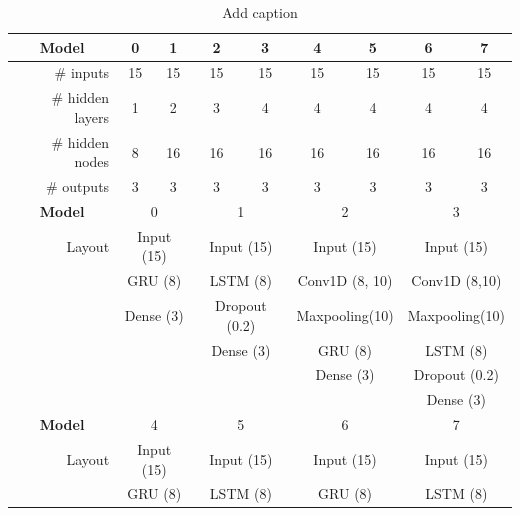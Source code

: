 \begin{table}[htbp]
  \centering
  \caption{Add caption}
    \begin{tabular}{r|cccccccc}
    \toprule
    \multicolumn{1}{c|}{\textbf{Model}} & 0     & 1     & 2     & 3     & 4     & 5     & 6     & 7 \\
    \midrule
    \# inputs & 15    & 15    & 15    & 15    & 15    & 15    & 15    & 15 \\
    \# hidden layers & 1     & 2     & 3     & 4     & 4     & 4     & 4     & 4 \\
    \# hidden nodes & 8     & 16    & 16    & 16    & 16    & 16    & 16    & 16 \\
    \# outputs & 3     & 3     & 3     & 3     & 3     & 3     & 3     & 3 \\
    \midrule
    \multicolumn{1}{c|}{\textbf{Model}} & \multicolumn{2}{c}{0} & \multicolumn{2}{c}{1} & \multicolumn{2}{c}{2} & \multicolumn{2}{c}{3} \\
    \midrule
    Layout & \multicolumn{2}{c}{Input (15)} & \multicolumn{2}{c}{Input (15)} & \multicolumn{2}{c}{Input (15)} & \multicolumn{2}{c}{Input (15)} \\
          & \multicolumn{2}{c}{GRU (8)} & \multicolumn{2}{c}{LSTM (8)} & \multicolumn{2}{c}{Conv1D (8, 10)} & \multicolumn{2}{c}{Conv1D (8,10)} \\
          & \multicolumn{2}{c}{Dense (3)} & \multicolumn{2}{c}{Dropout (0.2)} & \multicolumn{2}{c}{Maxpooling(10)} & \multicolumn{2}{c}{Maxpooling(10)} \\
          & \multicolumn{2}{c}{} & \multicolumn{2}{c}{Dense (3)} & \multicolumn{2}{c}{GRU (8)} & \multicolumn{2}{c}{LSTM (8)} \\
          & \multicolumn{2}{c}{} & \multicolumn{2}{c}{} & \multicolumn{2}{c}{Dense (3)} & \multicolumn{2}{c}{Dropout (0.2)} \\
          & \multicolumn{2}{c}{} & \multicolumn{2}{c}{} & \multicolumn{2}{c}{} & \multicolumn{2}{c}{Dense (3)} \\
    \midrule
    \multicolumn{1}{c|}{\textbf{Model}} & \multicolumn{2}{c}{4} & \multicolumn{2}{c}{5} & \multicolumn{2}{c}{6} & \multicolumn{2}{c}{7} \\
    \midrule
    Layout & \multicolumn{2}{c}{Input (15)} & \multicolumn{2}{c}{Input (15)} & \multicolumn{2}{c}{Input (15)} & \multicolumn{2}{c}{Input (15)} \\
          & \multicolumn{2}{c}{GRU (8)} & \multicolumn{2}{c}{LSTM (8)} & \multicolumn{2}{c}{GRU (8)} & \multicolumn{2}{c}{LSTM (8)} \\

\end{tabular}
\end{table}
